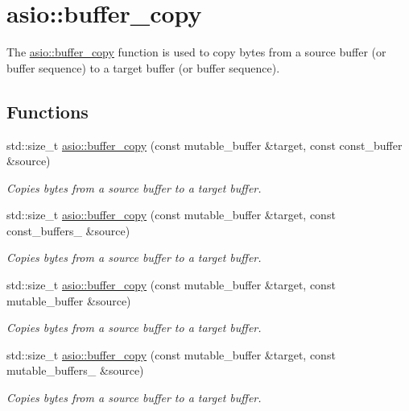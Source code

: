 \hypertarget{group__buffer__copy}{}\section{asio\+:\+:buffer\+\_\+copy}
\label{group__buffer__copy}


The \hyperlink{group__buffer__copy_ga8bc8cbf49a91e58205de746721d614d8}{asio\+::buffer\+\_\+copy} function is used to copy bytes from a source buffer (or buffer sequence) to a target buffer (or buffer sequence).  


\subsection*{Functions}
\begin{DoxyCompactItemize}
\item 
std\+::size\+\_\+t \hyperlink{group__buffer__copy_ga8bc8cbf49a91e58205de746721d614d8}{asio\+::buffer\+\_\+copy} (const mutable\+\_\+buffer \&target, const const\+\_\+buffer \&source)
\begin{DoxyCompactList}\small\item\em Copies bytes from a source buffer to a target buffer. \end{DoxyCompactList}\item 
std\+::size\+\_\+t \hyperlink{group__buffer__copy_ga09726c974288624f654a593b06ba1a0c}{asio\+::buffer\+\_\+copy} (const mutable\+\_\+buffer \&target, const const\+\_\+buffers\+\_ \&source)
\begin{DoxyCompactList}\small\item\em Copies bytes from a source buffer to a target buffer. \end{DoxyCompactList}\item 
std\+::size\+\_\+t \hyperlink{group__buffer__copy_gad7a03807f5083b423e1fff2173edf991}{asio\+::buffer\+\_\+copy} (const mutable\+\_\+buffer \&target, const mutable\+\_\+buffer \&source)
\begin{DoxyCompactList}\small\item\em Copies bytes from a source buffer to a target buffer. \end{DoxyCompactList}\item 
std\+::size\+\_\+t \hyperlink{group__buffer__copy_ga8ed1b2c796b937a0b044df908ad4e3d8}{asio\+::buffer\+\_\+copy} (const mutable\+\_\+buffer \&target, const mutable\+\_\+buffers\+\_ \&source)
\begin{DoxyCompactList}\small\item\em Copies bytes from a source buffer to a target buffer. \end{DoxyCompactList}\item 

\end{DoxyCompactItemize}
